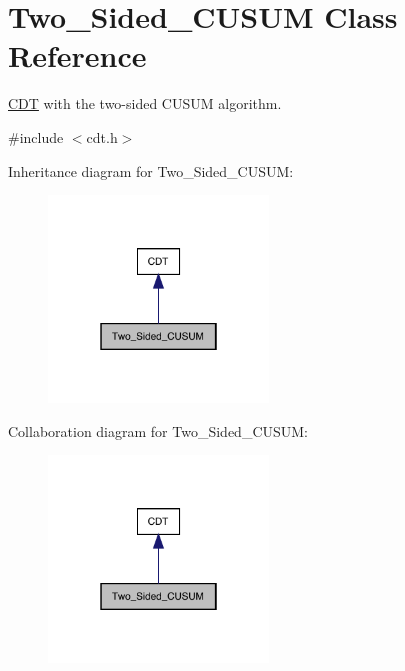 \hypertarget{class_two___sided___c_u_s_u_m}{}\section{Two\+\_\+\+Sided\+\_\+\+C\+U\+S\+UM Class Reference}
\label{class_two___sided___c_u_s_u_m}


\mbox{\hyperlink{class_c_d_t}{C\+DT}} with the two-\/sided C\+U\+S\+UM algorithm.  




{\ttfamily \#include $<$cdt.\+h$>$}



Inheritance diagram for Two\+\_\+\+Sided\+\_\+\+C\+U\+S\+UM\+:
\nopagebreak
\begin{figure}[H]
\begin{center}
\leavevmode
\includegraphics[width=166pt]{class_two___sided___c_u_s_u_m__inherit__graph}
\end{center}
\end{figure}


Collaboration diagram for Two\+\_\+\+Sided\+\_\+\+C\+U\+S\+UM\+:
\nopagebreak
\begin{figure}[H]
\begin{center}
\leavevmode
\includegraphics[width=166pt]{class_two___sided___c_u_s_u_m__coll__graph}
\end{center}
\end{figure}
